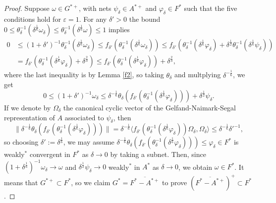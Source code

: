 \documentclass[noamsfonts,a4paper,10pt]{amsart}
\theoremstyle{plain}
\theoremstyle{definition}
\theoremstyle{remark}
\begin{document}
\begin{proof}
Suppose $\omega\in G^{*+}$, with nets $\psi_\delta\in A^{*+}$ and $\varphi_\delta\in F^*$ such that the five conditions hold for $\varepsilon=1$.
For any $\delta'>0$ the bound $0\le\theta_\delta^{-1}(\delta^{\frac16}\omega_\delta)\le\theta_\delta^{-1}(\delta^{\frac16}\omega)\le1$ implies
\begin{align*}
0&\le(1+\delta')^{-1}\theta_\delta^{-1}(\delta^{\frac16}\omega_\delta)
\le f_{\delta'}(\theta_\delta^{-1}(\delta^{\frac16}\omega_\delta))
\le f_{\delta'}(\theta_\delta^{-1}(\delta^{\frac16}\varphi_\delta)+\delta^{\frac12}\theta_\delta^{-1}(\delta^{\frac16}\psi_\delta))\\
&=f_{\delta'}(\theta_\delta^{-1}(\delta^{\frac16}\varphi_\delta)+\delta^{\frac23})
\le f_{\delta'}(\theta_\delta^{-1}(\delta^{\frac16}\varphi_\delta))+\delta^{\frac23},
\end{align*}
where the last inequality is by Lemma \ref{f2}, so taking $\theta_\delta$ and multplying $\delta^{-\frac16}$, we get
\[0\le(1+\delta')^{-1}\omega_\delta\le\delta^{-\frac16}\theta_\delta(f_{\delta'}(\theta_\delta^{-1}(\delta^{\frac16}\varphi_\delta)))+\delta^{\frac12}\psi_\delta.\]
If we denote by $\Omega_\delta$ the canonical cyclic vector of the Gelfand-Naimark-Segal representation of $A$ associated to $\psi_\delta$, then
\[\|\delta^{-\frac16}\theta_\delta(f_{\delta'}(\theta_\delta^{-1}(\delta^{\frac16}\varphi_\delta)))\|=\delta^{-\frac16}\langle f_{\delta'}(\theta_\delta^{-1}(\delta^{\frac16}\varphi_\delta))\Omega_\delta,\Omega_\delta\rangle\le\delta^{-\frac16}\delta'^{-1},\]
so choosing $\delta':=\delta^{\frac16}$, we may assume $\delta^{-\frac16}\theta_\delta(f_{\delta'}(\theta_\delta^{-1}(\delta^{\frac16}\varphi_\delta)))\le\varphi_\delta\in F^*$ is weakly$^*$ convergent in $F^*$ as $\delta\to0$ by taking a subnet.
Then, since $(1+\delta^{\frac16})^{-1}\omega_\delta\to\omega$ and $\delta^{\frac12}\psi_\delta\to0$ weakly$^*$ in $A^*$ as $\delta\to0$, we obtain $\omega\in F^*$.
It means that $G^{*+}\subset F^*$, so we claim $G^*=\overline{F^*-A^{*+}}$ to prove $(\overline{F^*-A^{*+}})^+\subset F^*$.


\end{proof}
\end{document}
